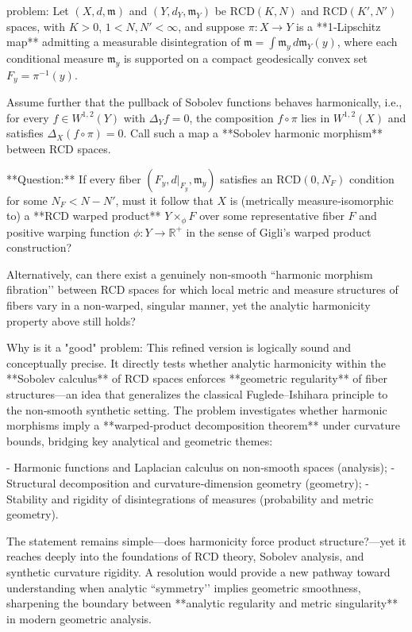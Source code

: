 problem:  
Let \((X,d,\mathfrak{m})\) and \((Y,d_Y,\mathfrak{m}_Y)\) be \(\mathrm{RCD}(K,N)\) and \(\mathrm{RCD}(K',N')\) spaces, with \(K>0\), \(1<N,N'<\infty\), and suppose \(\pi : X \to Y\) is a **1‑Lipschitz map** admitting a measurable disintegration of \(\mathfrak{m} = \int \mathfrak{m}_y\, d\mathfrak{m}_Y(y)\), where each conditional measure \(\mathfrak{m}_y\) is supported on a compact geodesically convex set \(F_y = \pi^{-1}(y)\).  

Assume further that the pullback of Sobolev functions behaves harmonically, i.e., for every \(f \in W^{1,2}(Y)\) with \(\Delta_Y f = 0\), the composition \(f \circ \pi\) lies in \(W^{1,2}(X)\) and satisfies \(\Delta_X(f \circ \pi) = 0\).  
Call such a map a **Sobolev harmonic morphism** between RCD spaces.  

**Question:**  
If every fiber \((F_y, d|_{F_y}, \mathfrak{m}_y)\) satisfies an \(\mathrm{RCD}(0,N_F)\) condition for some \(N_F < N-N'\), must it follow that \(X\) is (metrically measure‑isomorphic to) a **RCD warped product** \(Y \times_\phi F\) over some representative fiber \(F\) and positive warping function \(\phi : Y \to \mathbb{R}^+\) in the sense of Gigli’s warped product construction?  

Alternatively, can there exist a genuinely non‑smooth “harmonic morphism fibration’’ between RCD spaces for which local metric and measure structures of fibers vary in a non‑warped, singular manner, yet the analytic harmonicity property above still holds?  

Why is it a "good" problem:  
This refined version is logically sound and conceptually precise. It directly tests whether analytic harmonicity within the **Sobolev calculus** of RCD spaces enforces **geometric regularity** of fiber structures—an idea that generalizes the classical Fuglede–Ishihara principle to the non‑smooth synthetic setting. The problem investigates whether harmonic morphisms imply a **warped‑product decomposition theorem** under curvature bounds, bridging key analytical and geometric themes:  

- Harmonic functions and Laplacian calculus on non‑smooth spaces (analysis);  
- Structural decomposition and curvature‑dimension geometry (geometry);  
- Stability and rigidity of disintegrations of measures (probability and metric geometry).  

The statement remains simple—does harmonicity force product structure?—yet it reaches deeply into the foundations of RCD theory, Sobolev analysis, and synthetic curvature rigidity.  
A resolution would provide a new pathway toward understanding when analytic “symmetry’’ implies geometric smoothness, sharpening the boundary between **analytic regularity and metric singularity** in modern geometric analysis.